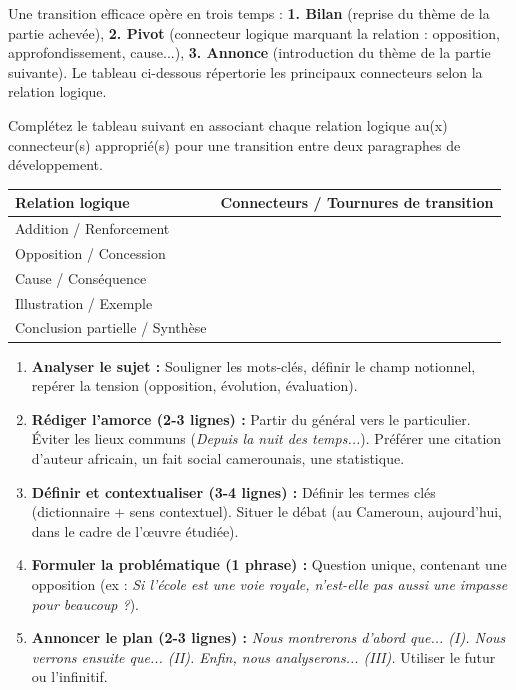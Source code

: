 \documentclass[11pt]{article}
\newcounter{popsec}
\newcounter{popsub}
\newcommand{\courssub}[1]{%
  \stepcounter{popsub}%
  \par\vspace{9pt}\noindent{\popxbold\fontsize{11.5}{13}\selectfont\color{popink}{\color{poporange}\thepopsec.\thepopsub}\hspace{6pt}#1}\par\nopagebreak\vspace{4pt}
}
\begin{document}
\begin{methode}
Une transition efficace opère en trois temps : \textbf{1. Bilan} (reprise du thème de la partie achevée), \textbf{2. Pivot} (connecteur logique marquant la relation : opposition, approfondissement, cause...), \textbf{3. Annonce} (introduction du thème de la partie suivante). Le tableau ci-dessous répertorie les principaux connecteurs selon la relation logique.
\end{methode}

\begin{exercice}
Complétez le tableau suivant en associant chaque relation logique au(x) connecteur(s) approprié(s) pour une transition entre deux paragraphes de développement.
\begin{center}
\begin{tabularx}{\linewidth}{|l|X|}\hline
\textbf{Relation logique} & \textbf{Connecteurs / Tournures de transition} \\ \hline
Addition / Renforcement & \\ \hline
Opposition / Concession & \\ \hline
Cause / Conséquence & \\ \hline
Illustration / Exemple & \\ \hline
Conclusion partielle / Synthèse & \\ \hline
\end{tabularx}
\end{center}
\end{exercice}

\courssub{Rédiger l'introduction}

\begin{methode}
\begin{enumerate}
\item \textbf{Analyser le sujet :} Souligner les mots-clés, définir le champ notionnel, repérer la tension (opposition, évolution, évaluation).
\item \textbf{Rédiger l'amorce (2-3 lignes) :} Partir du général vers le particulier. Éviter les lieux communs (\emph{Depuis la nuit des temps...}). Préférer une citation d'auteur africain, un fait social camerounais, une statistique.
\item \textbf{Définir et contextualiser (3-4 lignes) :} Définir les termes clés (dictionnaire + sens contextuel). Situer le débat (au Cameroun, aujourd'hui, dans le cadre de l'œuvre étudiée).
\item \textbf{Formuler la problématique (1 phrase) :} Question unique, contenant une opposition (ex : \emph{Si l'école est une voie royale, n'est-elle pas aussi une impasse pour beaucoup ?}).
\item \textbf{Annoncer le plan (2-3 lignes) :} \emph{Nous montrerons d'abord que... (I). Nous verrons ensuite que... (II). Enfin, nous analyserons... (III).} Utiliser le futur ou l'infinitif.
\end{enumerate}
\end{methode}
\end{document}
